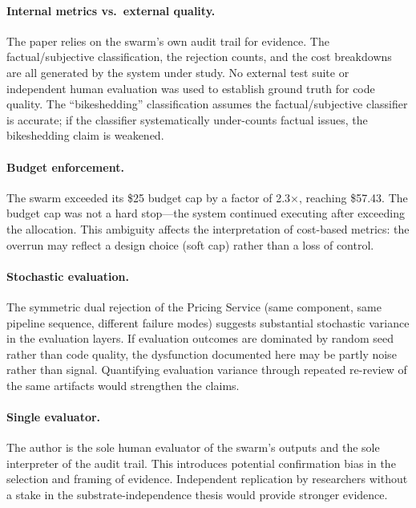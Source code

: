 \documentclass[11pt,a4paper]{article}
\begin{document}
\paragraph{Internal metrics vs.\ external quality.} The paper relies on the swarm's own audit trail for evidence. The factual/subjective classification, the rejection counts, and the cost breakdowns are all generated by the system under study. No external test suite or independent human evaluation was used to establish ground truth for code quality. The ``bikeshedding'' classification assumes the factual/subjective classifier is accurate; if the classifier systematically under-counts factual issues, the bikeshedding claim is weakened.

\paragraph{Budget enforcement.} The swarm exceeded its \$25 budget cap by a factor of 2.3$\times$, reaching \$57.43. The budget cap was not a hard stop---the system continued executing after exceeding the allocation. This ambiguity affects the interpretation of cost-based metrics: the overrun may reflect a design choice (soft cap) rather than a loss of control.

\paragraph{Stochastic evaluation.} The symmetric dual rejection of the Pricing Service (same component, same pipeline sequence, different failure modes) suggests substantial stochastic variance in the evaluation layers. If evaluation outcomes are dominated by random seed rather than code quality, the dysfunction documented here may be partly noise rather than signal. Quantifying evaluation variance through repeated re-review of the same artifacts would strengthen the claims.

\paragraph{Single evaluator.} The author is the sole human evaluator of the swarm's outputs and the sole interpreter of the audit trail. This introduces potential confirmation bias in the selection and framing of evidence. Independent replication by researchers without a stake in the substrate-independence thesis would provide stronger evidence.


\end{document}
